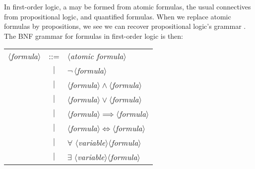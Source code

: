 \begin{definition}\label{fol-0004}%
In first-order logic, a  may be formed from atomic
formulas, the usual connectives from propositional logic, and quantified
formulas. When we replace atomic formulas by propositions, we see we can
recover propositional logic's grammar . The BNF grammar
for formulas in first-order logic is then: 
\begin{center}
\begin{tabular}{rcl}
$\langle$\textit{formula}$\rangle$ & ::= & $\langle$\textit{atomic formula}$\rangle$\\
& $|$ & $\neg\,\langle$\textit{formula}$\rangle$\\
& $|$ & $\langle$\textit{formula}$\rangle\land\langle$\textit{formula}$\rangle$\\
& $|$ & $\langle$\textit{formula}$\rangle\lor\langle$\textit{formula}$\rangle$\\
& $|$ & $\langle$\textit{formula}$\rangle\implies\langle$\textit{formula}$\rangle$\\
& $|$ & $\langle$\textit{formula}$\rangle\iff\langle$\textit{formula}$\rangle$\\
& $|$ & $\forall$ $\langle$\textit{variable}$\rangle\langle$\textit{formula}$\rangle$\\
& $|$ & $\exists$ $\langle$\textit{variable}$\rangle\langle$\textit{formula}$\rangle$\\
\end{tabular}
\end{center}
\end{definition}
